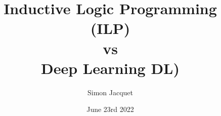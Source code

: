\documentclass{beamer}
\title{Inductive Logic Programming (ILP) \\ vs \\ Deep Learning DL)}
\author{Simon Jacquet}
\date{June 23rd 2022}
\begin{document}
\frame{\titlepage}


\end{document}
